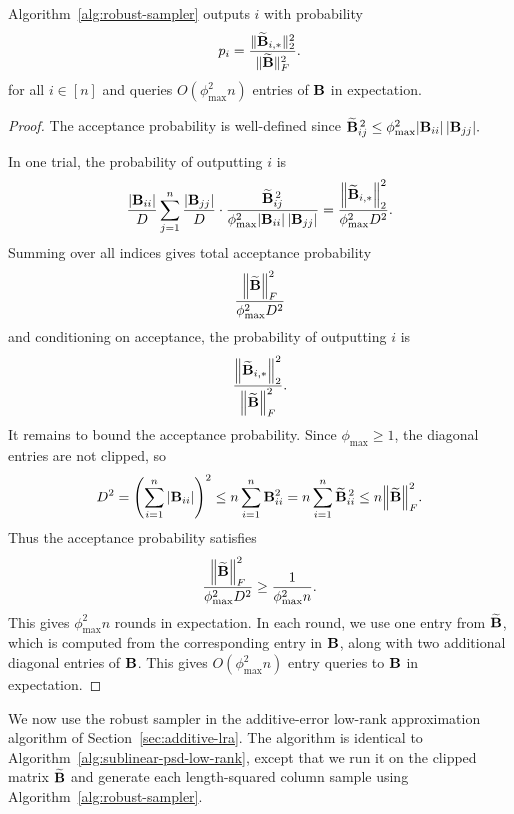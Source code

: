 \begin{lemma}
\label{lem:robust-sampler}
Algorithm~\ref{alg:robust-sampler} outputs $i$ with probability
\[
    p_i
    =
    \frac{\|\widetilde{\mathbf{B}}_{i,*}\|_2^2}{\|\widetilde{\mathbf{B}}\|_F^2}.
\]
for all $i\in [n]$ and queries $O(\phi_{\max}^2 n)$ entries of $\mathbf{B}$ in expectation.
\end{lemma}

\begin{proof}
The acceptance probability is well-defined since
\(
    \widetilde{\mathbf{B}}_{ij}^{\,2}
    \leq
    \phi_{\max}^2|\mathbf{B}_{ii}|\,|\mathbf{B}_{jj}|.
\)

In one trial, the probability of outputting $i$ is
\[
    \frac{|\mathbf{B}_{ii}|}{D}
    \sum_{j=1}^n
    \frac{|\mathbf{B}_{jj}|}{D}
    \cdot
    \frac{\widetilde{\mathbf{B}}_{ij}^{\,2}}
    {\phi_{\max}^2|\mathbf{B}_{ii}|\,|\mathbf{B}_{jj}|}
    =
    \frac{\norm{\widetilde{\mathbf{B}}_{i,*}}_2^2}
    {\phi_{\max}^2 D^2}.
\]
Summing over all indices gives total acceptance probability
\[
    \frac{\norm{\widetilde{\mathbf{B}}}_F^2}{\phi_{\max}^2 D^2}
\]
and conditioning on acceptance, the probability of outputting $i$ is
\[
    \frac{\norm{\widetilde{\mathbf{B}}_{i,*}}_2^2}{\norm{\widetilde{\mathbf{B}}}_F^2}.
\]
It remains to bound the acceptance probability. Since
$\phi_{\max}\geq 1$, the diagonal entries are not clipped, so
\[
    D^2
    =
    \left(\sum_{i=1}^n |\mathbf{B}_{ii}|\right)^2
    \leq
    n\sum_{i=1}^n \mathbf{B}_{ii}^2
    =
    n\sum_{i=1}^n \widetilde{\mathbf{B}}_{ii}^{\,2}
    \leq
    n\norm{\widetilde{\mathbf{B}}}_F^2.
\]
Thus the acceptance probability satisfies
\[
    \frac{\norm{\widetilde{\mathbf{B}}}_F^2}{\phi_{\max}^2D^2}
    \geq
    \frac{1}{\phi_{\max}^2 n}.
\]
This gives $\phi_{\max}^2 n$ rounds in expectation. In each round, we use one entry from $\widetilde {\mathbf{B}}$, which is computed from the corresponding entry in $\mathbf{B}$, along with two additional diagonal entries of $\mathbf{B}$. This gives $O(\phi_{\max}^2 n)$ entry queries to $\mathbf{B}$ in expectation.
\end{proof}

We now use the robust sampler in the additive-error low-rank approximation
algorithm of Section~\ref{sec:additive-lra}. The algorithm is identical to
Algorithm~\ref{alg:sublinear-psd-low-rank}, except that we run it on the clipped matrix
\(\widetilde{\mathbf{B}}\) and generate each length-squared column sample using
Algorithm~\ref{alg:robust-sampler}.

